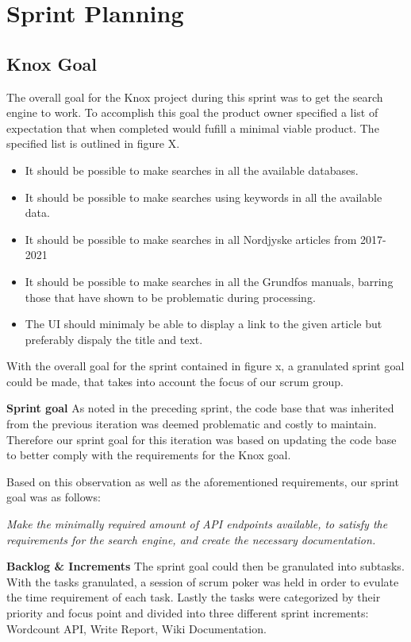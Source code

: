 \section{Sprint Planning}
\subsection{Knox Goal}
The overall goal for the Knox project during this sprint was to get the search engine to work. To accomplish this goal the product owner specified a list of expectation that when completed would fufill a minimal viable product. The specified list is outlined in figure X.
\begin{itemize}
	\item It should be possible to make searches in all the available databases.
	\item It should be possible to make searches using keywords in all the available data.
	\item It should be possible to make searches in all Nordjyske articles from 2017-2021
	\item It should be possible to make searches in all the Grundfos manuals, barring those that have shown to be problematic during processing.
	\item The UI should minimaly be able to display a link to the given article but preferably dispaly the title and text.
\end{itemize}

With the overall goal for the sprint contained in figure x, a granulated sprint goal could be made, that takes into account the focus of our scrum group.

\textbf{Sprint goal}
As noted in the preceding sprint, the code base that was inherited from the previous iteration was deemed problematic and costly to maintain. Therefore our sprint goal for this iteration was based on updating the code base to better comply with the requirements for the Knox goal.

Based on this observation as well as the aforementioned requirements, our sprint goal was as follows:

\textit{Make the minimally required amount of API endpoints available, to satisfy the requirements for the search engine, and create the necessary documentation.}

\textbf{Backlog \& Increments}
The sprint goal could then be granulated into subtasks. With the tasks granulated, a session of scrum poker was held in order to evulate the time requirement of each task. Lastly the tasks were categorized by their priority and focus point and divided into three different sprint increments: Wordcount API, Write Report, Wiki Documentation. 

